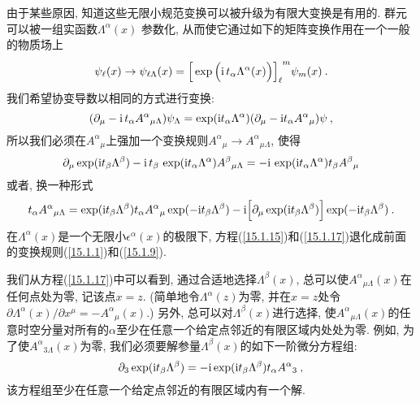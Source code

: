 由于某些原因, 知道这些无限小规范变换可以被升级为有限大变换是有用的. 群元可以被一组实函数$\Lambda ^{\alpha }(x)$%
参数化, 从而使它通过如下的矩阵变换作用在一个一般的物质场上\begin{equation}
\psi _{\ell }(x)\rightarrow \psi _{\ell \Lambda }(x)=\Big[ \exp \Big(
\mi\,t_{\alpha }\Lambda ^{\alpha }(x)\Big) \Big] _{\ell }^{\phantom{\ell}%
m}\psi _{m}(x)\:. \label{15.1.15}
\end{equation}%
我们希望协变导数以相同的方式进行变换:%
\begin{equation}
(\partial _{\mu }-\mi\,t_{\alpha }{A^{\alpha}}_{\mu \Lambda})\psi _{\Lambda
}=\exp (\mi t_{\alpha }\Lambda ^{\alpha })(\partial _{\mu }-\mi t_{\alpha }%
{A^{\alpha}}_{\mu })\psi \:,   \label{15.1.16}
\end{equation}%
所以我们必须在${A^{\alpha}}_{\mu}$上强加一个变换规则${A^{\alpha}}_{\mu }%
\rightarrow {A^{\alpha}}_{\mu \Lambda}$, 使得\[
\partial _{\mu }\exp (\mathrm{i} t_{\beta }\Lambda ^{\beta })-\mathrm{i}\,t_{\beta }\,\exp
(\mathrm{i} t_{\alpha }\Lambda ^{\alpha }){A^{\beta}}_{\mu \Lambda}=-\mathrm{i}\,\exp (\mathrm{i} t_{\alpha
}\Lambda ^{\alpha })t_{\beta }{A^{\beta}}_{\mu}
\]%
或者, 换一种形式\begin{equation}
t_{\alpha }{A^{\alpha}}_{\mu \Lambda}=\exp (\mathrm{i} t_{\beta }\Lambda ^{\beta
})t_{\alpha }{A^{\alpha}}_{\mu }\exp (-\mathrm{i} t_{\beta }\Lambda ^{\beta })-\mathrm{i}\Big[
\partial _{\mu }\exp (\mathrm{i} t_{\beta }\Lambda ^{\beta })\Big] \exp (-\mathrm{i} t_{\beta
}\Lambda ^{\beta })\:.   \label{15.1.17}
\end{equation}%
在$\Lambda ^{\alpha }(x)$是一个无限小$\epsilon ^{\alpha }(x)$的极限下, 方程(\ref{15.1.15})和(\ref{15.1.17})退化成前面的变换规则(\ref{15.1.1})和(\ref{15.1.9}).

我们从方程(\ref{15.1.17})中可以看到, 通过合适地选择$\Lambda ^{\beta }(x)$, 总可以使$%
{A^{\alpha}}_{\mu \Lambda}(x)$在任何{}点处为零, 记该点$x=z$. (简单地令$\Lambda ^{\alpha }(z)$为零, 并在$x=z$处令$\partial \Lambda ^{\alpha }(x)/\partial x^{\mu}=-{A^{\alpha}}_{\mu }(x)$.) 另外, 总可以对$\Lambda ^{\beta }(x)$进行选择, 
使${A^{\alpha}}_{\mu \Lambda}(x)$的任意{}时空分量对所有的$\alpha $至少在任意一个给定点邻近的有限区域内处处为零. 例如, 
为了使${A^{\alpha}}_{3 \Lambda}(x)$为零, 我们必须要解参量$\Lambda^{\beta }(x)$的如下一阶{}微分方程组:%
\begin{equation}
\partial _{3}\exp (\mathrm{i} t_{\beta }\Lambda ^{\beta })=-\mathrm{i}\exp (\mathrm{i} t_{\beta }\Lambda
^{\beta })t_{\alpha }{A^{\alpha}}_{3 }\:,   \label{15.1.18}
\end{equation}%
该方程组至少在任意一个给定点邻近的有限区域内有一个解.

